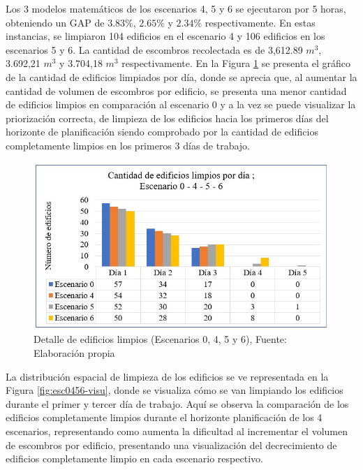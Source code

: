\documentclass[letterpaper,conference]{IEEEtran}
\begin{document}
Los 3 modelos matemáticos de los escenarios 4, 5 y 6 se ejecutaron por 5 horas, obteniendo un GAP de $3.83\%$, $2.65\%$ y $2.34\%$ respectivamente. En estas instancias, se limpiaron 104 edificios en el escenario 4 y 106 edificios en los escenarios 5 y 6. La cantidad de escombros recolectada es de  3,612.89 $m^{3}$, 3.692,21 $m^{3}$  y  3.704,18 $m^{3}$ respectivamente.
En la Figura \ref{fig:esc0456graf} se presenta el gráfico de la cantidad de edificios limpiados por día, donde se aprecia que, al aumentar la cantidad de volumen de escombros por edificio, se presenta una menor cantidad de edificios limpios en comparación al escenario 0 y a la vez se puede visualizar la priorización correcta, de limpieza de los edificios hacia los primeros días del horizonte de planificación siendo comprobado por la cantidad de edificios completamente limpios en los primeros 3 días de trabajo.


\begin{figure}[h!]
\centering
\includegraphics[scale=0.63]{Figuras/INDIC4.jpg} 
\caption{Detalle de edificios limpios (Escenarios 0, 4, 5 y 6), Fuente: Elaboración propia}
\label{fig:esc0456graf}
\end{figure}



La distribución espacial de limpieza de los edificios se ve representada en la Figura \ref{fig:esc0456-visu}, donde se visualiza cómo se van limpiando los edificios durante el primer y tercer día de trabajo. Aquí se observa la comparación de los edificios completamente limpios durante el horizonte planificación de los 4 escenarios, representando como aumenta la dificultad al incrementar el volumen de escombros por edificio, presentando una visualización del decrecimiento de edificios completamente limpio en cada escenario respectivo.
\end{document}
